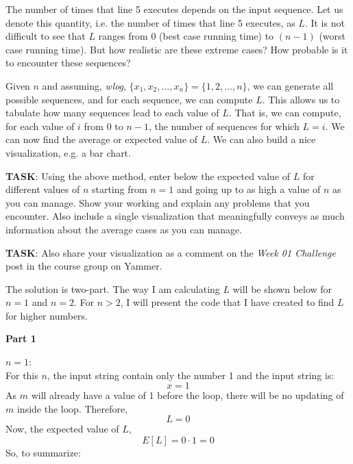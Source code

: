 \documentclass[a4paper]{exam}
\begin{document}
\begin{questions}
  The number of times that line 5 executes depends on the input sequence. Let us denote this quantity, i.e. the number of times that line 5 executes, as $L$. It is not difficult to see that $L$ ranges from $0$ (best case running time) to $(n-1)$ (worst case running time). But how realistic are these extreme cases? How probable is it to encounter these sequences?

  Given $n$ and assuming, \textit{wlog}, $\{x_1,x_2,\ldots,x_n\} = \{1,2,\ldots,n\}$, we can generate all possible sequences, and for each sequence, we can compute $L$. This allows us to tabulate how many sequences lead to each value of $L$. That is, we can compute, for each value of $i$ from $0$ to $n-1$, the number of sequences for which $L=i$. We can now find the average or expected value of $L$. We can also build a nice visualization, e.g. a bar chart.

\noindent\textbf{TASK}:  Using the above method, enter below the expected value of $L$ for different values of $n$ starting from $n=1$ and going up to as high a value of $n$ as you can manage. Show your working and explain any problems that you encounter. Also include a single visualization that meaningfully conveys as much information about the average cases as you can manage.

\noindent\textbf{TASK}:  Also share your visualization as a comment on the \textit{Week 01 Challenge} post in the course group on Yammer.

  \begin{mdframed}
   The solution is two-part. The way I am calculating $L$ will be shown below for $n = 1$ and $n = 2$. For $n > 2$, I will present the code that I have created to find $L$ for higher numbers.
   \begin{center}
       \textbf{Part 1}
   \end{center}
   \underline{$n = 1$}:\\
   For this $n$, the input string contain only the number 1 and the input string is:
   \[ x = 1 \]
   As $m$ will already have a value of 1 before the loop, there will be no updating of $m$ inside the loop. Therefore, 
   \[ L = 0 \]
   Now, the expected value of $L$,
   \[E[L] = 0 \cdot 1 = 0\]
   So, to summarize:
   

\end{mdframed}
\end{questions}
\end{document}

